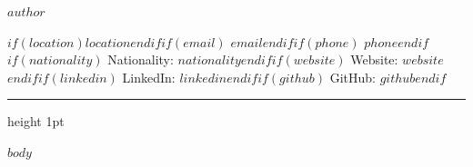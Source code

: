 \documentclass[9pt,letterpaper]{article}
\begin{document}

\begin{center}
    {\fontsize{14}{16}\selectfont\bfseries $author$}
    
    \vspace{0.15em}
    
    {\fontsize{9}{11}\selectfont
    $if(location)$$location$$endif$$if(email)$ \textperiodcentered{} \href{mailto:$email$}{$email$}$endif$$if(phone)$ \textperiodcentered{} $phone$$endif$$if(nationality)$ \textperiodcentered{} Nationality: $nationality$$endif$$if(website)$ \textperiodcentered{} Website: \href{https://$website$}{$website$}$endif$$if(linkedin)$ \textperiodcentered{} LinkedIn: \href{https://$linkedin$}{$linkedin$}$endif$$if(github)$ \textperiodcentered{} GitHub: \href{https://$github$}{$github$}$endif$
    }
\end{center}


\vspace{0.1em}
{\hrule height 1pt}
\vspace{0.35em}

$body$
\end{document}

